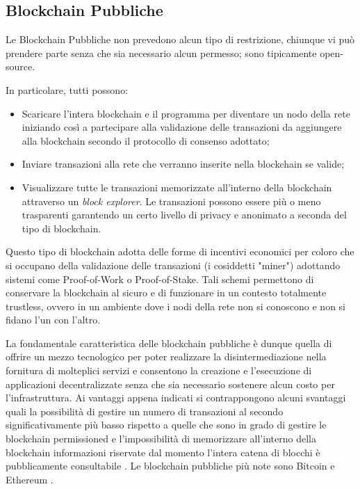 \subsection{Blockchain Pubbliche}
Le Blockchain Pubbliche non prevedono alcun tipo di restrizione, chiunque vi può prendere parte senza che sia necessario alcun permesso; sono tipicamente open-source.

In particolare, tutti possono:
\begin{itemize}
  \item Scaricare l'intera blockchain e il programma per diventare un nodo della rete iniziando così a partecipare alla validazione delle transazioni da aggiungere alla blockchain secondo il protocollo di consenso adottato;
  \item Inviare transazioni alla rete che verranno inserite nella blockchain se valide;
  \item Visualizzare tutte le transazioni memorizzate all'interno della blockchain attraverso un \textit{block explorer}. Le transazioni possono essere più o meno trasparenti garantendo un certo livello di privacy e anonimato a seconda del tipo di blockchain.
\end{itemize}

Questo tipo di blockchain adotta delle forme di incentivi economici per coloro che si occupano della validazione delle transazioni (i cosiddetti "miner") adottando sistemi come Proof-of-Work o Proof-of-Stake. Tali schemi permettono di conservare la blockchain al sicuro e di funzionare in un contesto totalmente trustless, ovvero in un ambiente dove i nodi della rete non si conoscono e non si fidano l'un con l'altro. 

La fondamentale caratteristica delle blockchain pubbliche è dunque quella di offrire un mezzo tecnologico per poter realizzare la disintermediazione nella fornitura di molteplici servizi e consentono la creazione e l'esecuzione di applicazioni decentralizzate senza che sia necessario sostenere alcun costo per l'infrastruttura. Ai vantaggi appena indicati si contrappongono alcuni svantaggi quali la possibilità di gestire un numero di transazioni al secondo significativamente più basso rispetto a quelle che sono in grado di gestire le blockchain permissioned e l'impossibilità di memorizzare all'interno della blockchain informazioni riservate dal momento l'intera catena di blocchi è pubblicamente consultabile \cite{vukolic2015quest}. Le blockchain pubbliche più note sono Bitcoin \cite{nakamoto2008bitcoin} e Ethereum \cite{yafimava_2019}.

